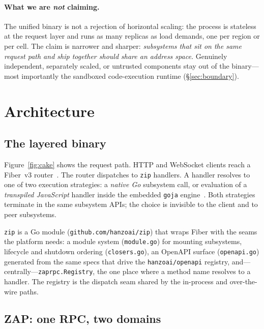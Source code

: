 \documentclass[11pt]{article}
\begin{document}
\paragraph{What we are \emph{not} claiming.}
The unified binary is not a rejection of horizontal scaling: the process is
stateless at the request layer and runs as many replicas as load demands,
one per region or per cell. The claim is narrower and sharper:
\emph{subsystems that sit on the same request path and ship together should
share an address space.} Genuinely independent, separately scaled, or
untrusted components stay out of the binary---most importantly the
sandboxed code-execution runtime (\S\ref{sec:boundary}).

\section{Architecture}
\label{sec:arch}

\subsection{The layered binary}

Figure~\ref{fig:cake} shows the request path. HTTP and WebSocket clients
reach a Fiber~v3 router~\cite{fiber}. The router dispatches to \texttt{zip}
handlers. A handler resolves to one of two execution strategies: a
\emph{native Go} subsystem call, or evaluation of a \emph{transpiled
JavaScript} handler inside the embedded \texttt{goja}
engine~\cite{goja}. Both strategies terminate in the same subsystem APIs;
the choice is invisible to the client and to peer subsystems.



\texttt{zip} is a Go module (\texttt{github.com/hanzoai/zip}) that
wraps Fiber with the seams the platform needs: a module system
(\texttt{module.go}) for mounting subsystems, lifecycle and shutdown
ordering (\texttt{closers.go}), an OpenAPI surface
(\texttt{openapi.go}) generated from the same specs that drive the
\texttt{hanzoai/openapi} registry, and---centrally---\texttt{zaprpc.Registry},
the one place where a method name resolves to a handler. The registry is
the dispatch seam shared by the in-process and over-the-wire paths.

\subsection{ZAP: one RPC, two domains}
\end{document}

